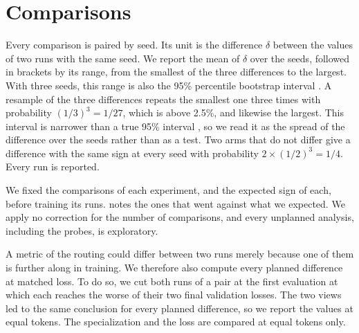 \section{Comparisons}
\label{sec:method-statistics}
Every comparison is paired by seed. Its unit is the difference $\delta$ between the values of two runs with the same seed. We report the mean of $\delta$ over the seeds, followed in brackets by its range, from the smallest of the three differences to the largest. With three seeds, this range is also the 95\% percentile bootstrap interval \cite{efron1993introduction}. A resample of the three differences repeats the smallest one three times with probability $(1/3)^3 = 1/27$, which is above 2.5\%, and likewise the largest. This interval is narrower than a true 95\% interval \cite{agarwal2021precipice}, so we read it as the spread of the difference over the seeds rather than as a test. Two arms that do not differ give a difference with the same sign at every seed with probability $2 \times (1/2)^3 = 1/4$. Every run is reported.

We fixed the comparisons of each experiment, and the expected sign of each, before training its runs.  notes the ones that went against what we expected. We apply no correction for the number of comparisons, and every unplanned analysis, including the probes, is exploratory.

A metric of the routing could differ between two runs merely because one of them is further along in training. We therefore also compute every planned difference at matched loss. To do so, we cut both runs of a pair at the first evaluation at which each reaches the worse of their two final validation losses. The two views led to the same conclusion for every planned difference, so we report the values at equal tokens. The specialization and the loss are compared at equal tokens only.
